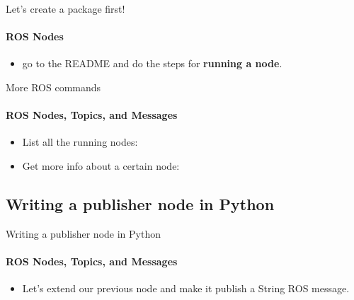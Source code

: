 \documentclass{beamer}
\begin{document}
\begin{frame}{Let's create a package first!}
    \framesubtitle{ROS Nodes}
    
    \begin{itemize}
        \item  go to the README and do the steps for \textbf{running a node}. 
    \end{itemize}   
\end{frame}


\begin{frame}{More ROS commands}
    \framesubtitle{ROS Nodes, Topics, and Messages}
    \begin{itemize}
        \item List all the running nodes:
        
        \begin{terminal}
            \color{green} 
        \end{terminal}
        
        \item Get more info about a certain node:
        
        \begin{terminal}
            \color{green} 
        \end{terminal}
        
              
        
    \end{itemize}
    
\end{frame}


\subsection{Writing a publisher node in Python}

\begin{frame}[fragile]{Writing a publisher node in Python}
    \framesubtitle{ROS Nodes, Topics, and Messages}
    
    \begin{itemize}
        \item  Let's extend our previous node and make it publish a String ROS message.
    \end{itemize}   
\end{frame}
 
\end{document}
